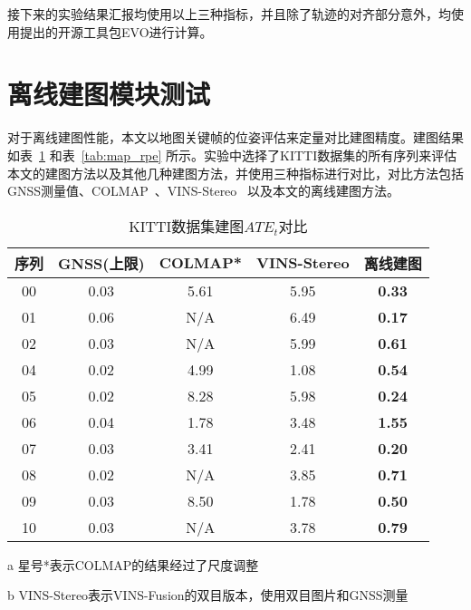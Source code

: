 接下来的实验结果汇报均使用以上三种指标，并且除了轨迹的对齐部分意外，均使用\citet{grupp2017evo}提出的开源工具包EVO进行计算。

\section{离线建图模块测试}
对于离线建图性能，本文以地图关键帧的位姿评估来定量对比建图精度。建图结果如表~\ref{tab:map_ate} 和表~\ref{tab:map_rpe} 所示。实验中选择了KITTI数据集的所有序列来评估本文的建图方法以及其他几种建图方法，并使用三种指标进行对比，对比方法包括GNSS测量值、COLMAP~\cite{schonberger2016structure}、VINS-Stereo~\cite{qin2019a} 以及本文的离线建图方法。

\begin{table}
\centering
\begin{threeparttable}
\caption{KITTI数据集建图$ATE_t$\textdownarrow{}对比}
\setlength{\tabcolsep}{5mm}
\begin{tabular}{c|c|ccc}
\toprule
序列 & GNSS(上限) & COLMAP*\cite{schonberger2016structure} & VINS-Stereo\cite{qin2019a} & 离线建图          \\ \midrule
00 & 0.03 & 5.61   & 5.95   & \cellcolor[HTML]{FA7F6F}\textbf{0.33} \\
01 & 0.06 & N/A    & 6.49   & \cellcolor[HTML]{FA7F6F}\textbf{0.17} \\
02 & 0.03 & N/A    & 5.99   & \cellcolor[HTML]{FA7F6F}\textbf{0.61} \\
04 & 0.02 & 4.99   & 1.08   & \cellcolor[HTML]{FA7F6F}\textbf{0.54} \\
05 & 0.02 & 8.28   & 5.98   & \cellcolor[HTML]{FA7F6F}\textbf{0.24} \\
06 & 0.04 & 1.78   & 3.48   & \cellcolor[HTML]{FA7F6F}\textbf{1.55} \\
07 & 0.03 & 3.41   & 2.41   & \cellcolor[HTML]{FA7F6F}\textbf{0.20} \\
08 & 0.02 & N/A    & 3.85   & \cellcolor[HTML]{FA7F6F}\textbf{0.71} \\
09 & 0.03 & 8.50   & 1.78   & \cellcolor[HTML]{FA7F6F}\textbf{0.50} \\
10 & 0.03 & N/A    & 3.78   & \cellcolor[HTML]{FA7F6F}\textbf{0.79} \\ \bottomrule
\end{tabular}
\label{tab:map_ate}
\begin{tablenotes}
  \item [a] 星号*表示COLMAP的结果经过了尺度调整
  \item [b] VINS-Stereo表示VINS-Fusion的双目版本，使用双目图片和GNSS测量
\end{tablenotes}
\end{threeparttable}
\end{table}

